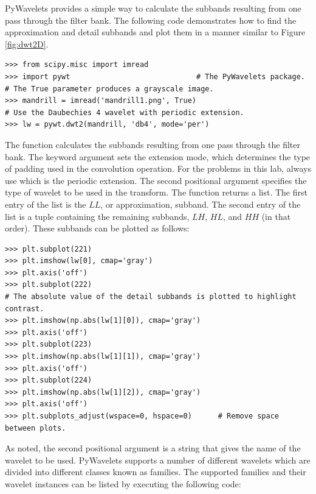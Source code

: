 PyWavelets provides a simple way to calculate the subbands resulting from one pass through the filter bank.
The following code demonstrates how to find the approximation and detail subbands and plot them in a manner similar to Figure \ref{fig:dwt2D}.

\begin{lstlisting}
>>> from scipy.misc import imread
>>> import pywt                             # The PyWavelets package.
# The True parameter produces a grayscale image.
>>> mandrill = imread('mandrill1.png', True)
# Use the Daubechies 4 wavelet with periodic extension.
>>> lw = pywt.dwt2(mandrill, 'db4', mode='per')
\end{lstlisting}

The function  calculates the subbands resulting from one pass through the filter bank.
The  keyword argument sets the extension mode, which determines the type of padding used in the convolution operation.
For the problems in this lab, always use  which is the periodic extension.
The second positional argument specifies the type of wavelet to be used in the transform.
The function  returns a list.
The first entry of the list is the $LL$, or approximation, subband.
The second entry of the list is a tuple containing the remaining subbands, $LH$, $HL$, and $HH$ (in that order).
These subbands can be plotted as follows:

\begin{lstlisting}
>>> plt.subplot(221)
>>> plt.imshow(lw[0], cmap='gray')
>>> plt.axis('off')
>>> plt.subplot(222)
# The absolute value of the detail subbands is plotted to highlight contrast.
>>> plt.imshow(np.abs(lw[1][0]), cmap='gray')
>>> plt.axis('off')
>>> plt.subplot(223)
>>> plt.imshow(np.abs(lw[1][1]), cmap='gray')
>>> plt.axis('off')
>>> plt.subplot(224)
>>> plt.imshow(np.abs(lw[1][2]), cmap='gray')
>>> plt.axis('off')
>>> plt.subplots_adjust(wspace=0, hspace=0)      # Remove space between plots.
\end{lstlisting}

As noted, the second positional argument is a string that gives the name of the wavelet to be used.
PyWavelets supports a number of different wavelets which are divided into different classes known as families.
The supported families and their wavelet instances can be listed by executing the following code:


